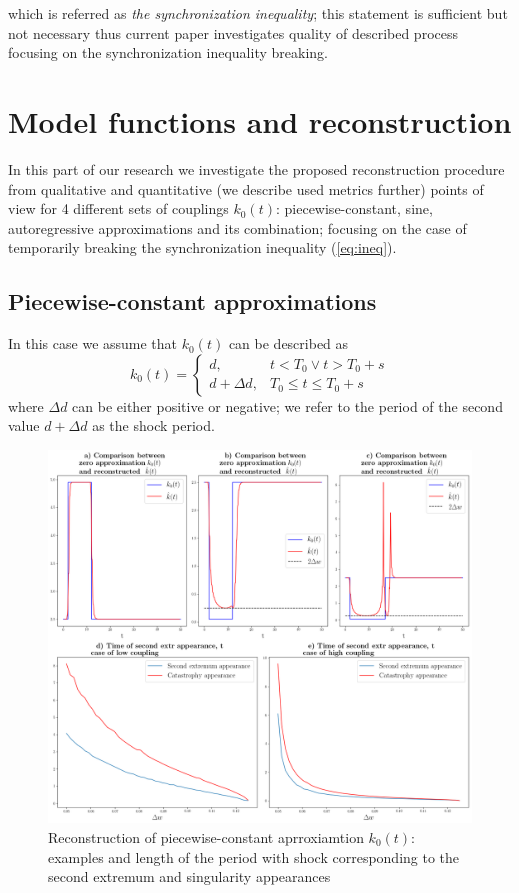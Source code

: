 \documentclass{ws-ijbc}
\begin{document}
which is referred as \emph{the synchronization inequality}; this statement is sufficient but not necessary thus current paper investigates quality of described process focusing on the synchronization inequality breaking.

\section{Model functions and reconstruction}

In this part of our research we investigate the proposed reconstruction
procedure from qualitative and quantitative (we describe used metrics
further) points of view for 4 different sets of couplings
$k_{0}(t)$: piecewise-constant, sine, autoregressive approximations
and its combination; focusing on the case of temporarily breaking
the synchronization inequality (\ref{eq:ineq}).

\subsection{Piecewise-constant approximations}

In this case we assume that $k_{0}(t)$ can be described as
\[
k_{0}(t)=\begin{cases}
d, & t<T_{0}\lor t>T_{0}+s\\
d+\Delta d, & T_{0}\le t\le T_{0}+s
\end{cases}
\]
where $\Delta d$ can be either positive or negative; we refer to
the period of the second value $d+\Delta d$ as the shock period.

\begin{figure}[!h]
\centering{}\includegraphics[width=1\textwidth]{../../../python/pics/v2/constv2}\caption{Reconstruction of piecewise-constant aprroxiamtion $k_{0}(t)$: examples
and length of the period with shock corresponding to the second extremum
and singularity appearances\label{fig:pc}}
\end{figure}
\end{document}
